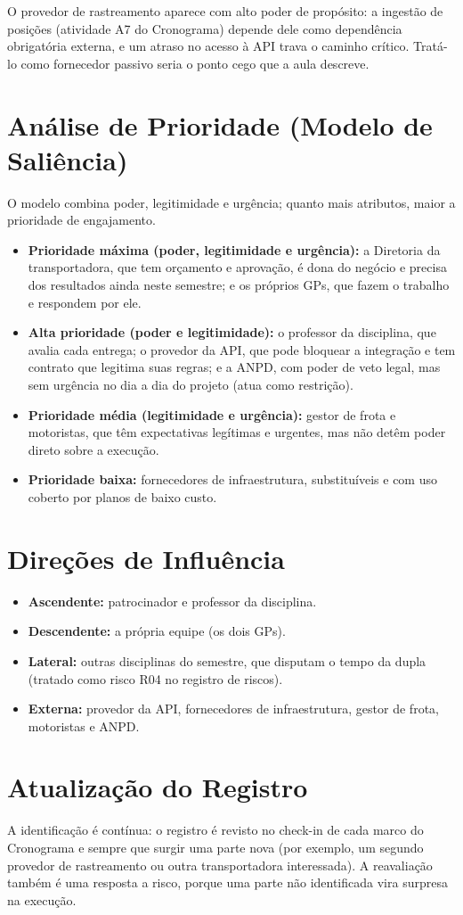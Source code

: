 \documentclass[11pt,a4paper]{article}
\begin{document}
\noindent O provedor de rastreamento aparece com alto poder de propósito: a ingestão de posições (atividade A7 do Cronograma) depende dele como dependência obrigatória externa, e um atraso no acesso à API trava o caminho crítico. Tratá-lo como fornecedor passivo seria o ponto cego que a aula descreve.

\section{Análise de Prioridade (Modelo de Saliência)}
O modelo combina poder, legitimidade e urgência; quanto mais atributos, maior a prioridade de engajamento.
\begin{itemize}[itemsep=4pt]
  \item \textbf{Prioridade máxima (poder, legitimidade e urgência):} a Diretoria da transportadora, que tem orçamento e aprovação, é dona do negócio e precisa dos resultados ainda neste semestre; e os próprios GPs, que fazem o trabalho e respondem por ele.
  \item \textbf{Alta prioridade (poder e legitimidade):} o professor da disciplina, que avalia cada entrega; o provedor da API, que pode bloquear a integração e tem contrato que legitima suas regras; e a ANPD, com poder de veto legal, mas sem urgência no dia a dia do projeto (atua como restrição).
  \item \textbf{Prioridade média (legitimidade e urgência):} gestor de frota e motoristas, que têm expectativas legítimas e urgentes, mas não detêm poder direto sobre a execução.
  \item \textbf{Prioridade baixa:} fornecedores de infraestrutura, substituíveis e com uso coberto por planos de baixo custo.
\end{itemize}

\section{Direções de Influência}
\begin{itemize}[itemsep=2pt]
  \item \textbf{Ascendente:} patrocinador e professor da disciplina.
  \item \textbf{Descendente:} a própria equipe (os dois GPs).
  \item \textbf{Lateral:} outras disciplinas do semestre, que disputam o tempo da dupla (tratado como risco R04 no registro de riscos).
  \item \textbf{Externa:} provedor da API, fornecedores de infraestrutura, gestor de frota, motoristas e ANPD.
\end{itemize}

\section{Atualização do Registro}
A identificação é contínua: o registro é revisto no check-in de cada marco do Cronograma e sempre que surgir uma parte nova (por exemplo, um segundo provedor de rastreamento ou outra transportadora interessada). A reavaliação também é uma resposta a risco, porque uma parte não identificada vira surpresa na execução.
\end{document}
